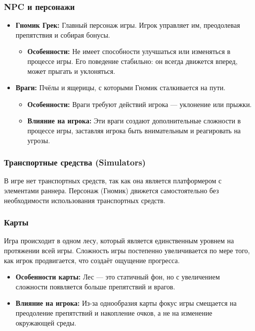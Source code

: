 \documentclass{article}
\begin{document}
\subsubsection{NPC и персонажи}
\begin{itemize}
    \item \textbf{Гномик Грек:} Главный персонаж игры. Игрок управляет им, преодолевая препятствия и собирая бонусы.
    \begin{itemize}
        \item \textbf{Особенности:} Не имеет способности улучшаться или изменяться в процессе игры. Его поведение стабильно: он всегда движется вперед, может прыгать и уклоняться.
    \end{itemize}
    \item \textbf{Враги:} Пчёлы и ящерицы, с которыми Гномик сталкивается на пути.
    \begin{itemize}
        \item \textbf{Особенности:} Враги требуют действий игрока — уклонение или прыжки.
        \item \textbf{Влияние на игрока:} Эти враги создают дополнительные сложности в процессе игры, заставляя игрока быть внимательным и реагировать на угрозы.
    \end{itemize}
\end{itemize}

\subsubsection{Транспортные средства (Simulators)}
В игре нет транспортных средств, так как она является платформером с элементами раннера. Персонаж (Гномик) движется самостоятельно без необходимости использования транспортных средств.

\subsubsection{Карты}
Игра происходит в одном лесу, который является единственным уровнем на протяжении всей игры. Сложность игры постепенно увеличивается по мере того, как игрок продвигается, что создаёт ощущение прогресса.
\begin{itemize}
    \item \textbf{Особенности карты:} Лес — это статичный фон, но с увеличением сложности появляется больше препятствий и врагов.
    \item \textbf{Влияние на игрока:} Из-за однообразия карты фокус игры смещается на преодоление препятствий и накопление очков, а не на изменение окружающей среды.
\end{itemize}
\end{document}
